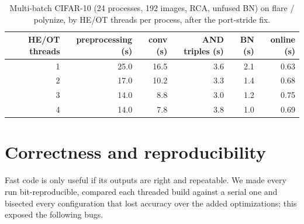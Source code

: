 \documentclass[10pt,a4paper]{article}
\begin{document}
\begin{table}[t]
\centering\small
\begin{tabular}{@{}rrrrrr@{}}
\toprule
HE/OT threads & preprocessing (s) & conv (s) & AND triples (s) & BN (s) & online (s)\\
\midrule
1 & 25.0 & 16.5 & 3.6 & 2.1 & 0.63\\
2 & 17.0 & 10.2 & 3.3 & 1.4 & 0.68\\
3 & 14.0 & 8.8 & 3.0 & 1.2 & 0.75\\
4 & 14.0 & 7.8 & 3.8 & 1.0 & 0.69\\
\bottomrule
\end{tabular}
\caption{Multi-batch CIFAR-10 (24 processes, 192 images, RCA, unfused BN) on flare / polynize, by HE/OT
threads per process, after the port-stride fix.}
\label{tab:multi}
\end{table}

\section{Correctness and reproducibility}\label{sec:correct}

Fast code is only useful if its outputs are right and repeatable. We made every run bit-reproducible, compared each
threaded build against a serial one and bisected every configuration that lost accuracy over the added
optimizations; this exposed the following bugs.
\end{document}
